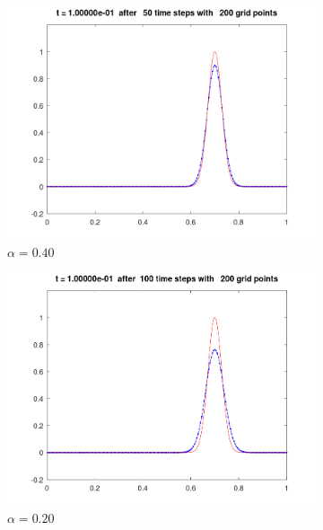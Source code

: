 \begin{solution}
    \begin{figure}[h]
        \centering
        \begin{subfigure}[b]{0.45\textwidth}
            \includegraphics[width=\textwidth]{problem_3c_alpha-0.40.png}
            \caption{$\alpha = 0.40$}
        \end{subfigure}
        \hfill
        \begin{subfigure}[b]{0.45\textwidth}
            \includegraphics[width=\textwidth]{problem_3c_alpha-0.20.png}
            \caption{$\alpha = 0.20$}
        \end{subfigure}
        \hfill
        \begin{subfigure}[b]{0.45\textwidth}

\end{subfigure}
\end{figure}
\end{solution}
